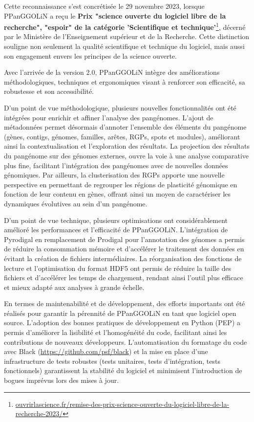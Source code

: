 Cette reconnaissance s’est concrétisée le 29 novembre 2023, lorsque PPanGGOLiN a reçu le \textbf{Prix "science ouverte du logiciel libre de la recherche", "espoir" de la catégorie 'Scientifique et technique'}\footnote{\href{https://www.ouvrirlascience.fr/remise-des-prix-science-ouverte-du-logiciel-libre-de-la-recherche-2023/}{ouvrirlascience.fr/remise-des-prix-science-ouverte-du-logiciel-libre-de-la-recherche-2023/}}, décerné par le Ministère  de l'Enseignement supérieur et de la Recherche. Cette distinction souligne non seulement la qualité scientifique et technique du logiciel, mais aussi son engagement envers les principes de la science ouverte.

Avec l’arrivée de la version 2.0, PPanGGOLiN intègre des améliorations méthodologiques, techniques et ergonomiques visant à renforcer son efficacité, sa robustesse et son accessibilité.

D’un point de vue méthodologique, plusieurs nouvelles fonctionnalités ont été intégrées pour enrichir et affiner l’analyse des pangénomes. L’ajout de métadonnées permet désormais d’annoter l’ensemble des éléments du pangénome (gènes, contigs, génomes, familles, arêtes, RGPs, spots et modules), améliorant ainsi la contextualisation et l’exploration des résultats. La projection des résultats du pangénome sur des génomes externes, ouvre la voie à une analyse comparative plus fine, facilitant l’intégration des pangénomes avec de nouvelles données génomiques. Par ailleurs, la clusterisation des RGPs apporte une nouvelle perspective en permettant de regrouper les régions de plasticité génomique en fonction de leur contenu en gènes, offrant ainsi un moyen de caractériser les dynamiques évolutives au sein d’un pangénome.

D’un point de vue technique, plusieurs optimisations ont considérablement amélioré les performances et l’efficacité de PPanGGOLiN. L’intégration de Pyrodigal \cite{larralde_pyrodigal_2022} en remplacement de Prodigal \cite{hyatt_prodigal_2010} pour l’annotation des génomes a permis de réduire la consommation mémoire et d’accélérer le traitement des données en évitant la création de fichiers intermédiaires. La réorganisation des fonctions de lecture et l’optimisation du format HDF5 ont permis de réduire la taille des fichiers et d’accélérer les temps de chargement, rendant ainsi l’outil plus efficace et mieux adapté aux analyses à grande échelle.

En termes de maintenabilité et de développement, des efforts importants ont été réalisés pour garantir la pérennité de PPanGGOLiN en tant que logiciel open source. L’adoption des bonnes pratiques de développement en Python (PEP) a permis d’améliorer la lisibilité et l’homogénéité du code, facilitant ainsi les contributions de nouveaux développeurs. L’automatisation du formatage du code avec Black (\url{https://github.com/psf/black}) et la mise en place d’une infrastructure de tests robustes (tests unitaires, tests d’intégration, tests fonctionnels) garantissent la stabilité du logiciel et minimisent l’introduction de bogues imprévus lors des mises à jour.

